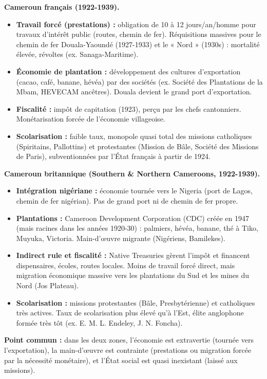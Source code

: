 \documentclass[11pt]{article}
\begin{document}
\begin{exemplebox}
\textbf{Cameroun français (1922-1939).}
\begin{itemize}
\item \textbf{Travail forcé (prestations) :} obligation de 10 à 12 jours/an/homme pour travaux d'intérêt public (routes, chemin de fer). Réquisitions massives pour le chemin de fer Douala-Yaoundé (1927-1933) et le « Nord » (1930s) : mortalité élevée, révoltes (ex. Sanaga-Maritime).
\item \textbf{Économie de plantation :} développement des cultures d'exportation (cacao, café, banane, hévéa) par des sociétés (ex. Société des Plantations de la Mbam, HEVECAM ancêtres). Douala devient le grand port d'exportation.
\item \textbf{Fiscalité :} impôt de capitation (1923), perçu par les chefs cantonniers. Monétarisation forcée de l'économie villageoise.
\item \textbf{Scolarisation :} faible taux, monopole quasi total des missions catholiques (Spiritains, Pallottins) et protestantes (Mission de Bâle, Société des Missions de Paris), subventionnées par l'État français à partir de 1924.
\end{itemize}

\textbf{Cameroun britannique (Southern \& Northern Cameroons, 1922-1939).}
\begin{itemize}
\item \textbf{Intégration nigériane :} économie tournée vers le Nigeria (port de Lagos, chemin de fer nigérian). Pas de grand port ni de chemin de fer propre.
\item \textbf{Plantations :} Cameroon Development Corporation (CDC) créée en 1947 (mais racines dans les années 1920-30) : palmiers, hévéa, banane, thé à Tiko, Muyuka, Victoria. Main-d'œuvre migrante (Nigériens, Bamilekes).
\item \textbf{Indirect rule et fiscalité :} Native Treasuries gèrent l'impôt et financent dispensaires, écoles, routes locales. Moins de travail forcé direct, mais migration économique massive vers les plantations du Sud et les mines du Nord (Jos Plateau).
\item \textbf{Scolarisation :} missions protestantes (Bâle, Presbytérienne) et catholiques très actives. Taux de scolarisation plus élevé qu'à l'Est, élite anglophone formée très tôt (ex. E. M. L. Endeley, J. N. Foncha).
\end{itemize}
\textbf{Point commun :} dans les deux zones, l'économie est extravertie (tournée vers l'exportation), la main-d'œuvre est contrainte (prestations ou migration forcée par la nécessité monétaire), et l'État social est quasi inexistant (laissé aux missions).
\end{exemplebox}
\end{document}

